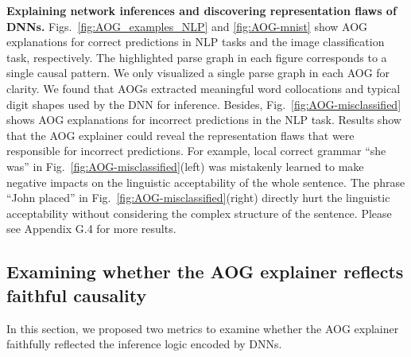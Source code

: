 \documentclass[10pt,twocolumn,letterpaper]{article}
\begin{document}
\textbf{Explaining network inferences and discovering representation flaws of DNNs.}
Figs.~\ref{fig:AOG_examples_NLP} and \ref{fig:AOG-mnist} show AOG explanations for correct predictions in NLP tasks and the image classification task, respectively.
The highlighted parse graph in each figure corresponds to a single causal pattern. 
We only visualized a single parse graph in each AOG for clarity.
We found that AOGs extracted meaningful word collocations and typical digit shapes used by the DNN for inference.
Besides, Fig.~\ref{fig:AOG-misclassified} shows AOG explanations for incorrect predictions in the NLP task.
Results show that the AOG explainer could reveal the representation flaws that were responsible for incorrect predictions.
For example, local correct grammar ``she was'' in Fig.~\ref{fig:AOG-misclassified}(left) was mistakenly learned to make negative impacts on the linguistic acceptability of the whole sentence.
The phrase ``John placed'' in Fig.~\ref{fig:AOG-misclassified}(right) directly hurt the linguistic acceptability without considering the complex structure of the sentence.
Please see Appendix G.4 for more results.



\subsection{Examining whether the AOG explainer reflects faithful causality}
\label{subsec:objectiveness-of-aog}

In this section, we proposed two metrics to examine whether the AOG explainer faithfully reflected the inference logic encoded by DNNs.
\end{document}
